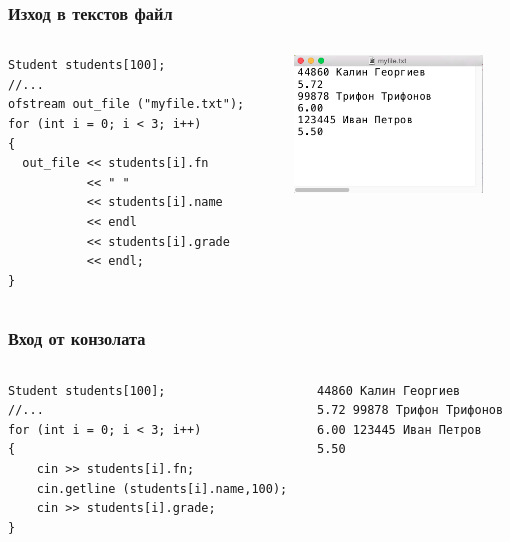 \documentclass{beamer}
\begin{document}
\begin{frame}[fragile]
\frametitle{Изход в текстов файл}



\begin{columns}[t]
  \begin{column}{0.5\textwidth}
      \vspace{-150px}
      \begin{flushleft}
      \begin{lstlisting}
Student students[100];
//...
ofstream out_file ("myfile.txt");
for (int i = 0; i < 3; i++)
{
  out_file << students[i].fn 
           << " "
           << students[i].name 
           << endl 
           << students[i].grade 
           << endl;
}
      \end{lstlisting}
      \end{flushleft} 
  \end{column}
  \begin{column}{0.5\textwidth}
  \includegraphics[width=5cm]{images/textedit}
  \end{column}
\end{columns}


\end{frame}




\begin{frame}[fragile]
\frametitle{Вход от конзолата}



\begin{columns}[t]
  \begin{column}{0.5\textwidth}
      \begin{flushleft}
      \begin{lstlisting}
Student students[100];
//...
for (int i = 0; i < 3; i++)
{
    cin >> students[i].fn;
    cin.getline (students[i].name,100);
    cin >> students[i].grade;
}
      \end{lstlisting}
      \end{flushleft} 
  \end{column}
  \begin{column}{0.5\textwidth}
\begin{verbatim}
44860 Калин Георгиев
5.72 99878 Трифон Трифонов
6.00 123445 Иван Петров
5.50

\end{verbatim}
  \end{column}
\end{columns}


\end{frame}
\end{document}
